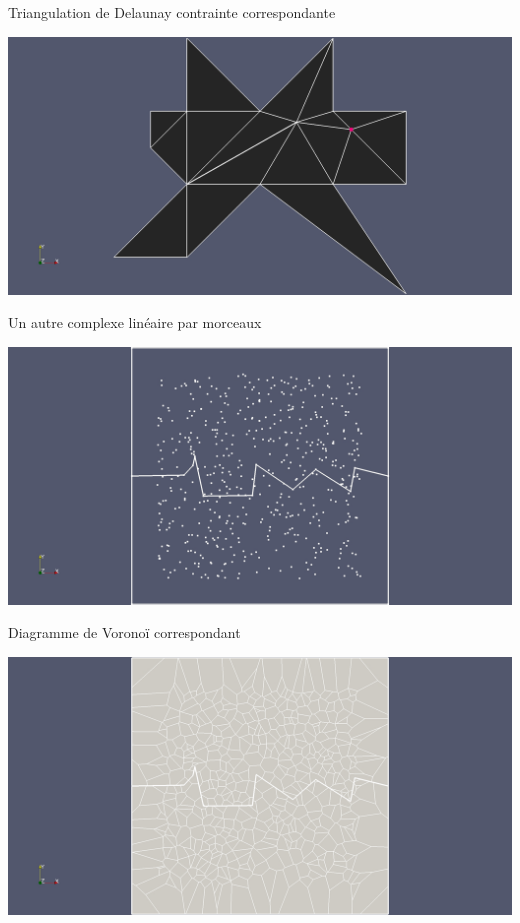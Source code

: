 \documentclass[aspectratio=169, 12pt, a4paper, hyperref={pdfauthor={Alexandre MARIN}, pdfkeywords={IFPEN, Delaunay, Voronoi, mesh generation}, colorlinks=true, linkcolor=purple, urlcolor=blue, citecolor=magenta}]{beamer}
\begin{document}
\begin{Energie}{\normalsize Triangulation de Delaunay contrainte correspondante}
\begin{center}
\includegraphics[scale=0.18, viewport=430 0 1800 1129, clip]{odd_cdt.jpg}
\end{center}
\end{Energie}

\begin{Energie}{\normalsize Un autre complexe linéaire par morceaux}
\begin{center}\vspace{-1cm}
\includegraphics[scale=0.18, viewport=500 0 1700 1300, clip]{plc.jpg}
\end{center}
\end{Energie}

\begin{Energie}{\normalsize Diagramme de Voronoï correspondant}
\begin{center}\vspace{-1cm}
\includegraphics[scale=0.18, viewport=500 0 1700 1300, clip]{extended_vor.jpg}
\end{center}
\end{Energie}
\end{document}
